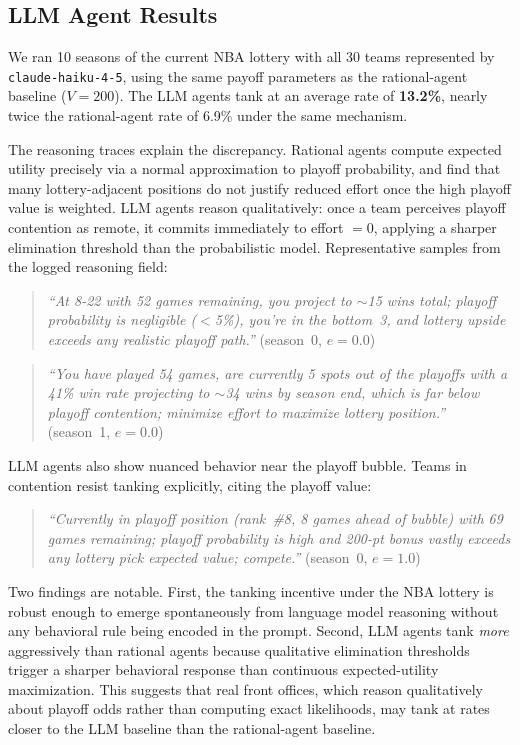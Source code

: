 \documentclass{article}
\begin{document}
\subsection{LLM Agent Results}

We ran 10 seasons of the current NBA lottery with all 30 teams represented
by \texttt{claude-haiku-4-5}, using the same payoff parameters as the
rational-agent baseline ($V = 200$).
The LLM agents tank at an average rate of \textbf{13.2\%}, nearly twice
the rational-agent rate of 6.9\% under the same mechanism.

The reasoning traces explain the discrepancy.
Rational agents compute expected utility precisely via a normal approximation
to playoff probability, and find that many lottery-adjacent positions do not
justify reduced effort once the high playoff value is weighted.
LLM agents reason qualitatively: once a team perceives playoff contention
as remote, it commits immediately to effort $= 0$, applying a sharper
elimination threshold than the probabilistic model.
Representative samples from the logged reasoning field:

\begin{quote}
\textit{``At 8-22 with 52 games remaining, you project to ${\sim}$15 wins
total; playoff probability is negligible ($<$5\%), you're in the bottom~3,
and lottery upside exceeds any realistic playoff path.''}
(season~0, $e = 0.0$)
\end{quote}

\begin{quote}
\textit{``You have played 54 games, are currently 5 spots out of the
playoffs with a 41\% win rate projecting to ${\sim}$34 wins by season end,
which is far below playoff contention; minimize effort to maximize lottery
position.''}
(season~1, $e = 0.0$)
\end{quote}

LLM agents also show nuanced behavior near the playoff bubble.
Teams in contention resist tanking explicitly, citing the playoff value:

\begin{quote}
\textit{``Currently in playoff position (rank~\#8, 8 games ahead of bubble)
with 69 games remaining; playoff probability is high and 200-pt bonus
vastly exceeds any lottery pick expected value; compete.''}
(season~0, $e = 1.0$)
\end{quote}

Two findings are notable.
First, the tanking incentive under the NBA lottery is robust enough to
emerge spontaneously from language model reasoning without any behavioral
rule being encoded in the prompt.
Second, LLM agents tank \emph{more} aggressively than rational agents
because qualitative elimination thresholds trigger a sharper behavioral
response than continuous expected-utility maximization.
This suggests that real front offices, which reason qualitatively about
playoff odds rather than computing exact likelihoods, may tank at rates
closer to the LLM baseline than the rational-agent baseline.
\end{document}
